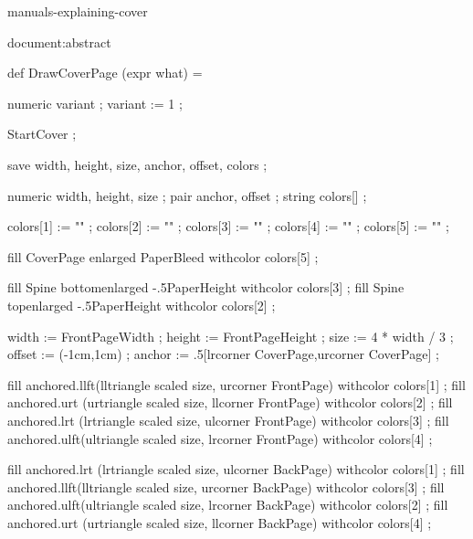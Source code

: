 

\startenvironment manuals-explaining-cover

\startsetups document:abstract
    \framed [
        foregroundstyle=bold,
        foregroundcolor=white,
        width=7.5cm,
        align={normal,tolerant},
        frame=off,
        strut=no,
    ] {
        \getbuffer[abstract]
    }
\stopsetups

\startMPinclusions

    def DrawCoverPage (expr what) =

        numeric variant ; variant := 1 ;

        StartCover ;

            save width, height, size, anchor, offset, colors ;

            numeric width, height, size ; pair anchor, offset ; string colors[] ;

            colors[1] := "" ;
            colors[2] := "" ;
            colors[3] := "" ;
            colors[4] := "" ;
            colors[5] := "" ;

            fill CoverPage enlarged PaperBleed withcolor colors[5] ;

            fill Spine bottomenlarged  -.5PaperHeight withcolor colors[3] ;
            fill Spine topenlarged     -.5PaperHeight withcolor colors[2] ;

            width  := FrontPageWidth ;
            height := FrontPageHeight ;
            size   := 4 * width / 3 ;
            offset := (-1cm,1cm) ;
            anchor := .5[lrcorner CoverPage,urcorner CoverPage] ;

            fill anchored.llft(lltriangle scaled size, urcorner FrontPage) withcolor colors[1] ;
            fill anchored.urt (urtriangle scaled size, llcorner FrontPage) withcolor colors[2] ;
            fill anchored.lrt (lrtriangle scaled size, ulcorner FrontPage) withcolor colors[3] ;
            fill anchored.ulft(ultriangle scaled size, lrcorner FrontPage) withcolor colors[4] ;

            fill anchored.lrt (lrtriangle scaled size, ulcorner BackPage) withcolor colors[1] ;
            fill anchored.llft(lltriangle scaled size, urcorner BackPage) withcolor colors[3] ;
            fill anchored.ulft(ultriangle scaled size, lrcorner BackPage) withcolor colors[2] ;
            fill anchored.urt (urtriangle scaled size, llcorner BackPage) withcolor colors[4] ;

